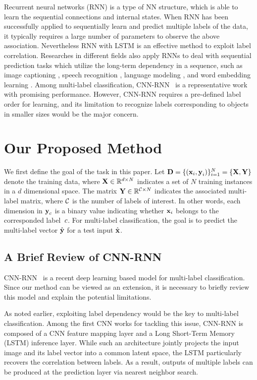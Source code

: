 \documentclass[letterpaper]{article} %
\begin{document}
Recurrent neural networks (RNN) is a type of NN structure, which is able to learn the sequential connections and internal states. When RNN has been successfully applied to sequentially learn and predict multiple labels of the data, it typically requires a large number of parameters to observe the above association. Nevertheless RNN with LSTM \cite{hochreiter1997long} is an effective method to exploit label correlation. Researches in different fields also apply RNNs to deal with sequential prediction tasks which utilize the long-term dependency in a sequence, such as image captioning \cite{mao2014deep}, speech recognition \cite{graves2013speech}, language modeling \cite{sundermeyer2012lstm}, and word embedding learning \cite{le2015compositional}. Among multi-label classification, CNN-RNN~\cite{wang2016cnn} is a representative work with promising performance. However, CNN-RNN requires a pre-defined label order for learning, and its limitation to recognize labels corresponding to objects in smaller sizes would be the major concern.


\section{Our Proposed Method}
We first define the goal of the task in this paper. Let $\textbf{D}=\{(\textbf{x}_i,\textbf{y}_i)\}_{i=1}^N = \{\textbf{X},\textbf{Y}\}$ denote the training data, where $\textbf{X} \in \mathbb{R}^{d\times N}$ indicates a set of $N$ training instances in a $d$ dimensional space. The matrix $\textbf{Y} \in \mathbb{R}^{\mathcal{C}\times N}$ indicates the associated multi-label matrix, where $\mathcal{C}$ is the number of labels of interest. In other words, each dimension in $\textbf{y}_c$ is a binary value indicating whether $\textbf{x}_i$ belongs to the corresponded label~$c$. For multi-label classification, the goal is to predict the multi-label vector $\hat{\textbf{y}}$ for a test input $\hat{\textbf{x}}$.

\subsection{A Brief Review of CNN-RNN}

CNN-RNN~\cite{wang2016cnn} is a recent deep learning based model for multi-label classification. Since our method can be viewed as an extension, it is necessary to briefly review this model and explain the potential limitations.

As noted earlier, exploiting label dependency would be the key to multi-label classification. Among the first CNN works for tackling this issue, CNN-RNN is composed of a CNN feature mapping layer and a Long Short-Term Memory (LSTM) inference layer. While such an architecture jointly projects the input image and its label vector into a common latent space, the LSTM particularly recovers the correlation between labels. As a result, outputs of multiple labels can be produced at the prediction layer via nearest neighbor search.
\end{document}
